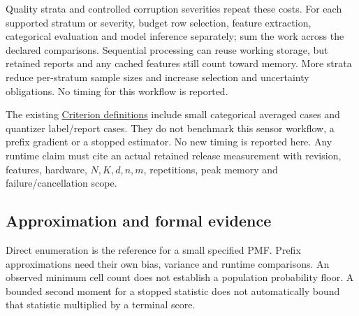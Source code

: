 \documentclass[11pt,a4paper]{article}
\begin{document}
Quality strata and controlled corruption severities repeat these costs. For each supported stratum or severity, budget row selection, feature extraction, categorical evaluation and model inference separately; sum the work across the declared comparisons. Sequential processing can reuse working storage, but retained reports and any cached features still count toward memory. More strata reduce per-stratum sample sizes and increase selection and uncertainty obligations. No timing for this workflow is reported.

The existing \href{https://github.com/sepahead/pid-rs/blob/main/crates/pid-core/benches/estimators.rs}{Criterion definitions} include small categorical averaged cases and quantizer label/report cases. They do not benchmark this sensor workflow, a prefix gradient or a stopped estimator. No new timing is reported here. Any runtime claim must cite an actual retained release measurement with revision, features, hardware, \(N,K,d,n,m\), repetitions, peak memory and failure/cancellation scope.

\par{}

\subsection{Approximation and formal evidence}\label{approximation-and-formal-evidence}

Direct enumeration is the reference for a small specified PMF. Prefix approximations need their own bias, variance and runtime comparisons. An observed minimum cell count does not establish a population probability floor. A bounded second moment for a stopped statistic does not automatically bound that statistic multiplied by a terminal score.
\end{document}
